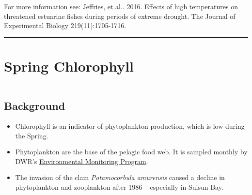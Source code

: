 \documentclass[
]{book}
\providecommand{\tightlist}{%
  \setlength{\itemsep}{0pt}\setlength{\parskip}{0pt}}
\begin{document}
\begin{disclaimer}
For more information see: Jeffries, et al.. 2016. Effects of high
temperatures on threatened estuarine fishes during periods of extreme
drought. The Journal of Experimental Biology 219(11):1705-1716.
\end{disclaimer}

\begin{center}\rule{0.5\linewidth}{0.5pt}\end{center}

\hypertarget{spring-chlorophyll}{%
\section{Spring Chlorophyll}\label{spring-chlorophyll}}

\begin{column}{0.7\textwidth}
\hypertarget{background-2}{%
\subsection{Background}\label{background-2}}

\begin{itemize}
\tightlist
\item
  Chlorophyll is an indicator of phytoplankton production, which is low during the Spring.
\item
  Phytoplankton are the base of the pelagic food web. It is sampled monthly by DWR's \href{https://emp.baydeltalive.com/wiki/12297}{Environmental Monitoring Program}.
\item
  The invasion of the clam \emph{Potamocorbula amurensis} caused a decline in phytoplankton and zooplankton after 1986 -- especially in Suisun Bay.
\end{itemize}
\end{column}
\end{document}
